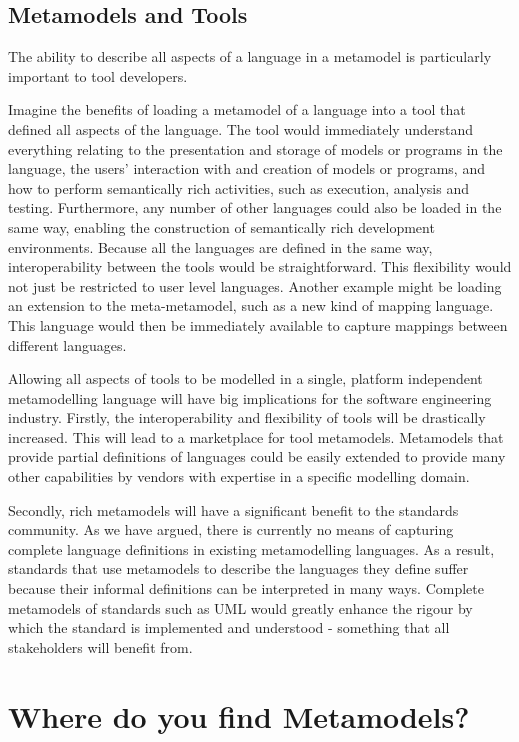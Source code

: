 \subsection{Metamodels and Tools}

The ability to describe all aspects of a language in a metamodel
is particularly important to tool developers.

Imagine the benefits of loading a metamodel of a language into a
tool that defined all aspects of the language. The tool would
immediately understand everything relating to the presentation and
storage of models or programs in the language, the users'
interaction with and creation of models or programs, and how to
perform semantically rich activities, such as execution, analysis
and testing. Furthermore, any number of other languages could also
be loaded in the same way, enabling the construction of
semantically rich development environments. Because all the
languages are defined in the same way, interoperability between
the tools would be straightforward. This flexibility would not
just be restricted to user level languages. Another example might
be loading an extension to the meta-metamodel, such as a new kind
of mapping language. This language would then be immediately
available to capture mappings between different languages.

Allowing all aspects of tools to be modelled in a single, platform
independent metamodelling language will have big implications for
the software engineering industry. Firstly, the interoperability
and flexibility of tools will be drastically increased. This will
lead to a marketplace for tool metamodels. Metamodels that provide
partial definitions of languages could be easily extended to
provide many other capabilities by vendors with expertise in a
specific modelling domain.

Secondly, rich metamodels will have a significant benefit to the
standards community. As we have argued, there is currently no
means of capturing complete language definitions in existing
metamodelling languages. As a result, standards that use
metamodels to describe the languages they define suffer because
their informal definitions can be interpreted in many ways.
Complete metamodels of standards such as UML would greatly enhance
the rigour by which the standard is implemented and understood -
something that all stakeholders will benefit from.

\section{Where do you find Metamodels?}

